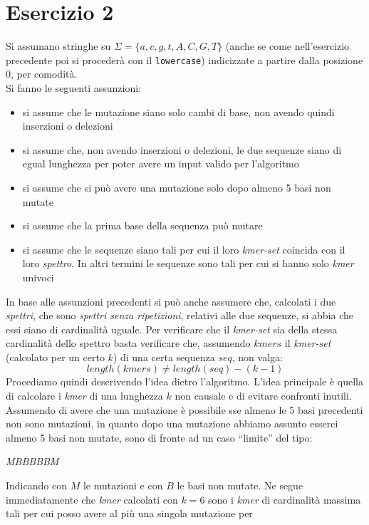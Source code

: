 \documentclass[a4paper,12pt, oneside]{book}
\begin{document}
\chapter{Esercizio 2}
Si assumano stringhe su $\Sigma=\{a,c,g,t,A,C,G,T\}$ (anche se come
nell'esercizio precedente poi si procederà con il \texttt{lowercase})
indicizzate a partire dalla posizione 0, per comodità.\\
Si fanno le seguenti assunzioni:
\begin{itemize}
  \item si assume che le mutazione siano solo cambi di base, non avendo quindi
  inserzioni o delezioni
  \item si assume che, non avendo inserzioni o delezioni, le due sequenze siano
  di egual lunghezza per poter avere un input valido per l'algoritmo
  \item si assume che si può avere una mutazione solo dopo almeno 5 basi non
  mutate 
  \item si assume che la prima base della sequenza può mutare
  \item si assume che le sequenze siano tali per cui il loro \textit{kmer-set}
  coincida con il loro \textit{spettro}. In altri termini le sequenze sono tali
  per cui si hanno solo \textit{kmer} univoci
\end{itemize}
In base alle assunzioni precedenti si può anche assumere che, calcolati i due
\textit{spettri}, che sono \textit{spettri senza ripetizioni}, relativi alle due
sequenze, si abbia che essi siano di cardinalità uguale. Per verificare che il
\textit{kmer-set} sia della stessa cardinalità dello spettro basta verificare
che, assumendo $kmers$ il \textit{kmer-set} (calcolato per un certo $k$) di una
certa sequenza $seq$, non valga: 
\[length(kmers) \neq length(seq)-(k-1)\]
Procediamo quindi descrivendo l'idea dietro l'algoritmo. L'idea principale è
quella di calcolare i \textit{kmer} di una lunghezza $k$ non causale e di
evitare confronti inutili. Assumendo di avere che una mutazione è possibile sse
almeno le 5 basi precedenti non sono mutazioni, in quanto dopo una mutazione
abbiamo assunto esserci almeno 5 basi non mutate, sono di fronte ad un caso
``limite'' del tipo:
\begin{center}
  \textit{{\color{red}M}BBBBB{\color{red}M}}
\end{center}
Indicando con $M$ le mutazioni e con $B$ le basi non mutate. Ne segue
immediatamente che \textit{kmer} calcolati con $k=6$ sono i \textit{kmer} di
cardinalità massima tali per cui posso avere al più una singola mutazione per
\end{document}
